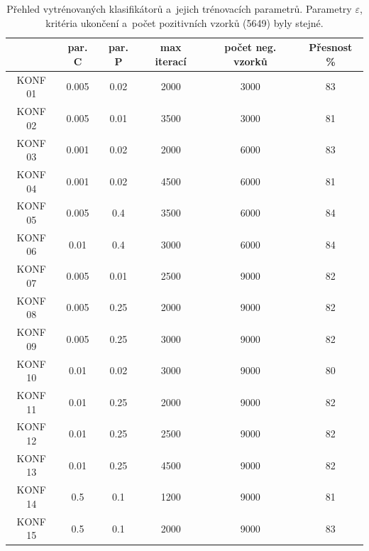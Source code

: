 \begin{table}[H]
\centering
\caption{Přehled vytrénovaných klasifikátorů a~jejich trénovacích parametrů. Parametry $\varepsilon$, kritéria ukončení a~počet pozitivních vzorků (5649) byly stejné.}
\begin{tabular} { |c|c|c|c|c|c| }
\hline
{}             & {par. C}     & {par. P}      & {max iterací} & {počet neg. vzorků} & {Přesnost \%}  \\ \hline
KONF 01		& 	0.005	& 	  0.02	 &   2000   	  &		  3000   	    &        83	 \\ \hline
KONF 02		& 	0.005	& 	  0.01	 &   3500   	  &		  3000   	    &        81	 \\ \hline
KONF 03		& 	0.001	& 	  0.02	 &   2000   	  &		  6000   	    &        83	 \\ \hline
KONF 04		& 	0.001	& 	  0.02	 &   4500   	  &		  6000   	    &        81	 \\ \hline
KONF 05		& 	0.005	& 	  0.4 	 &   3500   	  &		  6000   	    &        84	 \\ \hline
KONF 06		& 	0.01 	& 	  0.4 	 &   3000   	  &		  6000   	    &        84	 \\ \hline
KONF 07		& 	0.005	& 	  0.01	 &   2500   	  &		  9000   	    &        82	 \\ \hline
KONF 08		& 	0.005	& 	  0.25	 &   2000   	  &		  9000   	    &        82	 \\ \hline
KONF 09		& 	0.005	& 	  0.25	 &   3000   	  &		  9000   	    &        82	 \\ \hline
KONF 10 	     & 	0.01 	& 	  0.02	 &   3000   	  &		  9000   	    &        80	 \\ \hline
KONF 11 	     & 	0.01 	& 	  0.25	 &   2000   	  &		  9000   	    &        82	 \\ \hline
KONF 12 	     & 	0.01 	& 	  0.25	 &   2500   	  &		  9000   	    &        82	 \\ \hline
KONF 13 	     & 	0.01 	& 	  0.25	 &   4500   	  &		  9000   	    &        82	 \\ \hline
KONF 14 	     & 	0.5	 	& 	  0.1	 &   1200   	  &		  9000   	    &        81	 \\ \hline
KONF 15 	     & 	0.5		& 	  0.1	 &   2000   	  &		  9000   	    &        83	 \\ \hline
\end{tabular}
\label{classTab1}
\end{table}

